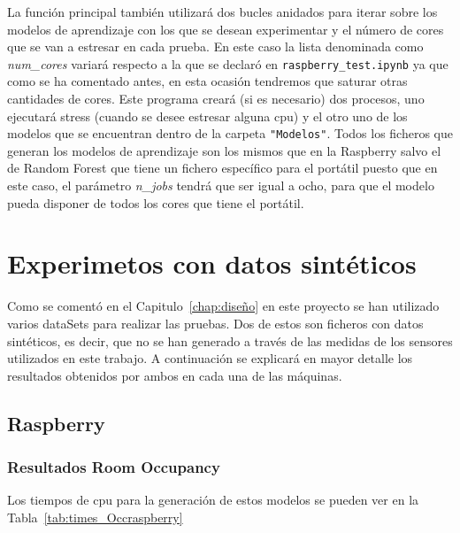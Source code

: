 \documentclass[a4paper, 12pt]{book}
\begin{document}
La función principal también utilizará dos bucles anidados para iterar sobre los modelos de aprendizaje con los que se desean experimentar y el número de cores que se van a estresar en cada prueba. En este caso la lista denominada como \textit{num\_cores} variará respecto a la que se declaró en \texttt{raspberry\_test.ipynb} ya que como se ha comentado antes, en esta ocasión tendremos que saturar otras cantidades de cores. Este programa creará (si es necesario) dos procesos, uno ejecutará stress (cuando se desee estresar alguna cpu) y el otro uno de los modelos que se encuentran dentro de la carpeta \texttt{"Modelos"}. Todos los ficheros que generan los modelos de aprendizaje son los mismos que en la Raspberry salvo el de Random Forest que tiene un fichero específico para el portátil puesto que en este caso, el parámetro \textit{n\_jobs} tendrá que ser igual a ocho, para que el modelo pueda disponer de todos los cores que tiene el portátil. 


\section{Experimetos con datos sintéticos}
\label{sec:exp_dSinteticos}

Como se comentó en el Capitulo~\ref{chap:diseño} en este proyecto se han utilizado varios dataSets para realizar las pruebas. Dos de estos son ficheros con datos sintéticos, es decir, que no se han generado a través de las medidas de los sensores utilizados en este trabajo. A continuación se explicará en mayor detalle los resultados obtenidos por ambos en cada una de las máquinas.

\subsection{Raspberry}
\label{sub:rasp_sinteticos}

\subsubsection{Resultados Room Occupancy}
\label{subsubsec:occ_raspberry}

Los tiempos de cpu para la generación de estos modelos se pueden ver en la Tabla~\ref{tab:times_Occraspberry}
\end{document}
